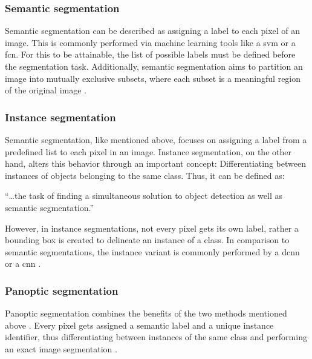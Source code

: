 \subsubsection{Semantic segmentation}
Semantic segmentation can be described as assigning a label to each pixel of an image.
This is commonly performed via machine learning tools like a \acrfull{svm} or a \acrfull{fcn}.
For this to be attainable, the list of possible labels must be defined before the segmentation task.
Additionally, semantic segmentation aims to partition an image into mutually exclusive subsets,
where each subset is a meaningful region of the original image \cite{haoBriefSurveySemantic2020,longFullyConvolutionalNetworks2015}.

\subsubsection{Instance segmentation}
Semantic segmentation, like mentioned above, focuses on assigning a label from a predefined list to each pixel in an image.
Instance segmentation, on the other hand, alters this behavior through an important concept:
Differentiating between instances of objects belonging to the same class.
Thus, it can be defined as:
\begin{displayquote}
	``\ldots\space the task of finding a simultaneous solution to object detection as well as semantic segmentation.''
\end{displayquote}
However, in instance segmentations, not every pixel gets its own label, rather a bounding box is created to delineate an instance of a class.
In comparison to semantic segmentations, the instance variant is commonly performed by a \acrfull{dcnn} or a \acrfull{cnn} \cite{hafizSurveyInstanceSegmentation2020,chenMaskLabInstanceSegmentation2018}.

\subsubsection{Panoptic segmentation}
Panoptic segmentation combines the benefits of the two methods mentioned above
\cite{kirillovPanopticSegmentation2019}.
Every pixel gets assigned a semantic label and a unique instance identifier,
thus differentiating between instances of the same class and performing an exact image segmentation
\cite{kirillovPanopticSegmentation2019}.

